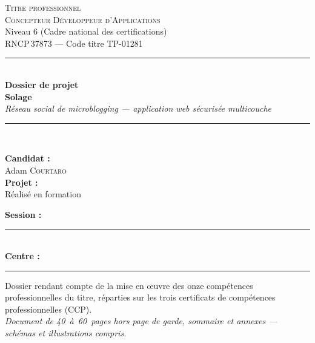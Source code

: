 \begin{titlepage}
\thispagestyle{empty}
\centering

\vspace*{1cm}

{\Large\scshape Titre professionnel}\\[0.3cm]
{\Large\scshape Concepteur Développeur d'Applications}\\[0.2cm]
{\large Niveau 6 (Cadre national des certifications)}\\[0.2cm]
{\large RNCP\,37873 — Code titre TP-01281}\\[1.2cm]

\rule{\linewidth}{0.6pt}\\[0.5cm]
{\Huge\bfseries\color{solageDark} Dossier de projet}\\[0.4cm]
{\Huge\bfseries\color{solageBlue} Solage}\\[0.4cm]
{\large\itshape Réseau social de microblogging — application web sécurisée multicouche}\\[0.3cm]
\rule{\linewidth}{0.6pt}\\[1.5cm]

\begin{minipage}{0.45\textwidth}
  \begin{flushleft}\large
    \textbf{Candidat :}\\
    Adam \textsc{Courtaro}\\[0.6cm]
    \textbf{Projet :}\\
    Réalisé en formation
  \end{flushleft}
\end{minipage}
\hfill
\begin{minipage}{0.45\textwidth}
  \begin{flushright}\large
    \textbf{Session :}\\
    \rule{4cm}{0.4pt}\\[0.6cm]   %
    \textbf{Centre :}\\
    \rule{4cm}{0.4pt}            %
  \end{flushright}
\end{minipage}

\vfill

{\small Dossier rendant compte de la mise en œuvre des onze compétences
professionnelles du titre, réparties sur les trois certificats de compétences
professionnelles (CCP).}\\[0.4cm]
{\small\itshape Document de \mbox{40 à 60 pages} hors page de garde, sommaire et
annexes — schémas et illustrations compris.}

\vspace{0.8cm}
\end{titlepage}
